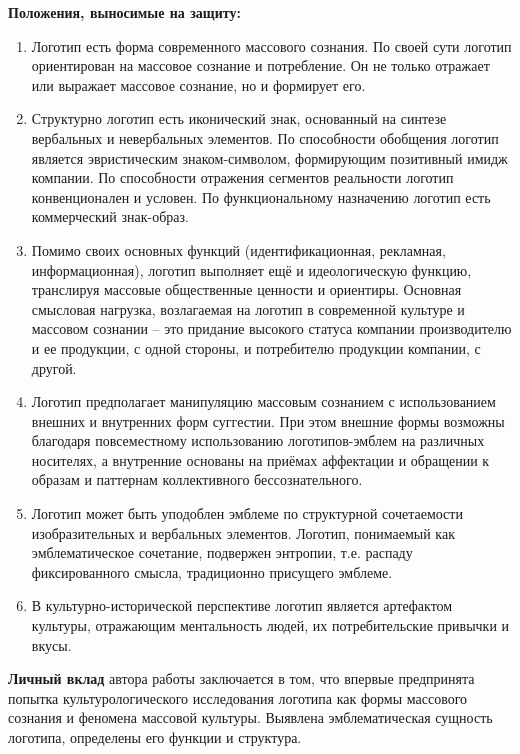 \textbf{Положения, выносимые на защиту:}
\begin{enumerate}
\item Логотип есть форма современного массового сознания. По своей сути логотип ориентирован на массовое сознание и потребление. Он не только отражает или выражает массовое сознание, но и формирует его.
\item Структурно логотип есть иконический знак, основанный на синтезе вербальных и невербальных элементов. По способности обобщения логотип является эвристическим знаком-символом, формирующим позитивный имидж компании. По способности отражения сегментов реальности логотип конвенционален и условен. По функциональному назначению логотип есть коммерческий знак-образ.
\item Помимо своих основных функций (идентификационная, рекламная, информационная), логотип выполняет ещё и идеологическую функцию, транслируя массовые общественные ценности и ориентиры. Основная смысловая нагрузка, возлагаемая на логотип в современной культуре и массовом сознании – это придание высокого статуса компании производителю и ее продукции, с одной стороны, и потребителю продукции компании, с другой.
\item Логотип предполагает манипуляцию массовым сознанием с использованием внешних и внутренних форм суггестии. При этом внешние формы возможны благодаря повсеместному использованию логотипов-эмблем на различных носителях, а внутренние основаны на приёмах аффектации и обращении к образам и паттернам коллективного бессознательного.
\item Логотип может быть уподоблен эмблеме по структурной сочетаемости изобразительных и вербальных элементов. Логотип, понимаемый как эмблематическое сочетание, подвержен энтропии, т.е. распаду фиксированного смысла, традиционно присущего эмблеме.
\item В культурно-исторической перспективе логотип является артефактом культуры, отражающим ментальность людей, их потребительские привычки и вкусы.
\end{enumerate}

\textbf{Личный вклад} автора работы заключается в том, что впервые предпринята попытка культурологического исследования логотипа как формы массового сознания и феномена массовой культуры. Выявлена эмблематическая сущность логотипа, определены его функции и структура.

